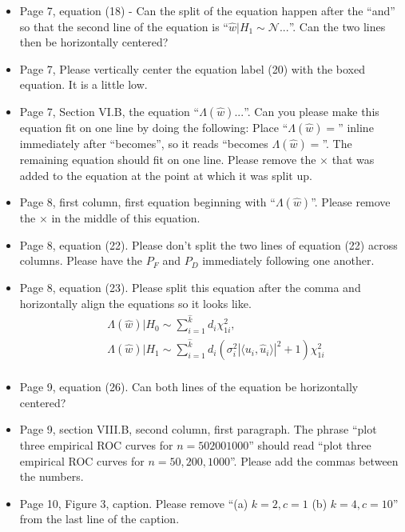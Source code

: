 \documentclass[11pt]{article}
\begin{document}
\begin{itemize}
  \item Page 7, equation (18) - Can the split of the equation happen after the ``and'' so
    that the second line of the equation is ``$\widehat{w}|H_1\sim\mathcal{N}...$''. Can
    the two lines then be horizontally centered?
  \item Page 7, Please vertically center the equation label (20) with the boxed
    equation. It is a little low.
  \item Page 7, Section VI.B, the equation ``$\Lambda(\widehat{w})...$''. Can you please make
    this equation fit on one line by doing the following: Place
    ``$\Lambda(\widehat{w})=$'' inline immediately after ``becomes'', so it reads
    ``becomes $\Lambda(\widehat{w})=$''. The remaining equation should fit on one
    line. Please remove the $\times$ that was added to the equation at the point at which    
    it was split up.
  \item Page 8, first column, first equation beginning with
    ``$\Lambda(\widehat{w})$''. Please remove the $\times$ in the middle of this equation.
  \item Page 8, equation (22). Please don't split the two lines of equation (22) across
    columns. Please have the $P_F$ and $P_D$ immediately following one another.
  \item Page 8, equation (23). Please split this equation after the comma and
    horizontally align the equations so it looks like.
    \begin{equation*}
      \begin{aligned}
        & \Lambda(\widehat{w})|H_0\sim\sum_{i=1}^{\widehat{k}}d_i\chi_{1i}^2,\\
        & \Lambda(\widehat{w})|H_1\sim\sum_{i=1}^{\widehat{k}}d_i\left(\sigma_i^2|\langle
          u_i, \widehat{u}_i\rangle|^2 +1\right)\chi_{1i}^2\\
      \end{aligned}
    \end{equation*}
  \item Page 9, equation (26). Can both lines of the equation be horizontally centered?
  \item Page 9, section VIII.B, second column, first paragraph. The phrase ``plot three
    empirical ROC curves for $n=50 200 1000$'' should read ``plot three
    empirical ROC curves for $n=50, 200, 1000$''. Please add the commas between the
    numbers.
  \item Page 10, Figure 3, caption. Please remove ``(a) $k=2,c=1$ (b) $k=4,c=10$'' from
    the last line of the caption.

\end{itemize}
\end{document}
